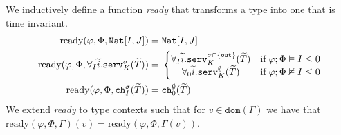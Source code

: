 \begin{defi}\label{def:readyfunc}
We inductively define a function \textit{ready} that transforms a type into one that is time invariant.
\begin{align*}
    \text{ready}(\varphi,\Phi,\natinterval{I}{J}) =&\; \natinterval{I}{J}\\
    \text{ready}(\varphi,\Phi,\forall_I\widetilde{i}.\texttt{serv}^{\sigma}_K(\widetilde{T})) =&\; \left\{ \begin{matrix}
        \forall_I\widetilde{i}.\texttt{serv}^{\sigma \cap \{\texttt{out}\}}_K(\widetilde{T}) & \text{if}\; \varphi;\Phi\vDash I \leq 0\\
        \forall_0\widetilde{i}.\texttt{serv}^{\emptyset}_K(\widetilde{T}) & \text{if}\; \varphi;\Phi\nvDash I \leq 0
    \end{matrix} \right.\\
    \text{ready}(\varphi,\Phi,\texttt{ch}^\sigma_I(\widetilde{T})) =&\;\texttt{ch}^\emptyset_0(\widetilde{T})%
\end{align*}
We extend \textit{ready} to type contexts such that for $v\in\texttt{dom}(\Gamma)$ we have that $\text{ready}(\varphi,\Phi,\Gamma)(v)=\text{ready}(\varphi,\Phi,\Gamma(v))$.
\end{defi}



